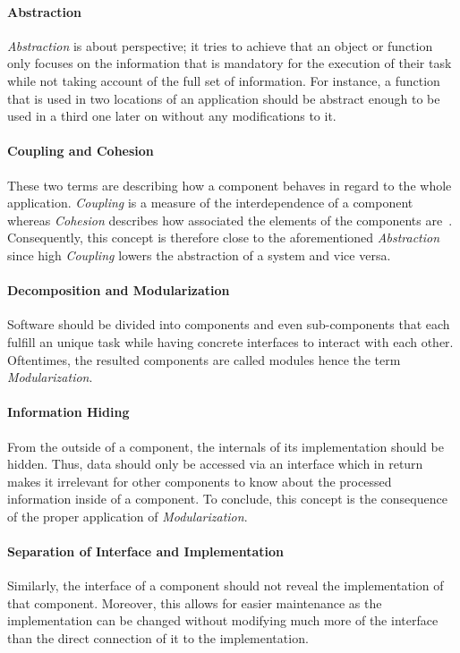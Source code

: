 \documentclass[12pt,a4paper]{report}
\begin{document}
\paragraph{Abstraction}
\textit{Abstraction} is about perspective; it tries to achieve that an object or
function only focuses on the information that is mandatory for the execution of
their task while not taking account of the full set of information.
For instance, a function that is used in two locations of an application
should be abstract enough to be used in a third one later on without
any modifications to it.

\paragraph{Coupling and Cohesion}
These two terms are describing how a component behaves in regard to the whole application.
\textit{Coupling} is a measure of the interdependence of a component whereas
\textit{Cohesion} describes how associated the elements of the components are~\cite{swebok}.
Consequently, this concept is therefore close to the aforementioned \textit{Abstraction}
since high \textit{Coupling} lowers the abstraction of a system and vice versa.

\paragraph{Decomposition and Modularization}
Software should be divided into components and even sub-components that each fulfill
an unique task while having concrete interfaces to interact with each other.
Oftentimes, the resulted components are called modules hence the term \textit{Modularization}.

\paragraph{Information Hiding}
From the outside of a component, the internals of its implementation should be hidden.
Thus, data should only be accessed via an interface which in return makes it irrelevant
for other components to know about the processed information inside of a component.
To conclude, this concept is the consequence of the proper application of \textit{Modularization}.

\paragraph{Separation of Interface and Implementation}
Similarly, the interface of a component should not reveal the implementation of
that component. Moreover, this allows for easier maintenance as the implementation
can be changed without modifying much more of the interface than the direct connection
of it to the implementation.
\end{document}
